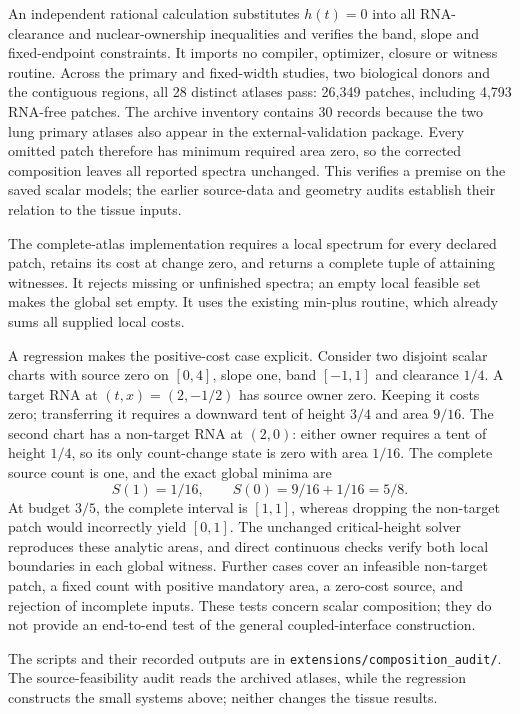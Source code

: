 \documentclass[10pt,letterpaper]{article}
\begin{document}
An independent rational calculation substitutes $h(t)=0$ into all RNA-clearance and nuclear-ownership inequalities and verifies the band, slope and fixed-endpoint constraints. It imports no compiler, optimizer, closure or witness routine. Across the primary and fixed-width studies, two biological donors and the contiguous regions, all 28 distinct atlases pass: 26,349 patches, including 4,793 RNA-free patches. The archive inventory contains 30 records because the two lung primary atlases also appear in the external-validation package. Every omitted patch therefore has minimum required area zero, so the corrected composition leaves all reported spectra unchanged. This verifies a premise on the saved scalar models; the earlier source-data and geometry audits establish their relation to the tissue inputs.

The complete-atlas implementation requires a local spectrum for every declared patch, retains its cost at change zero, and returns a complete tuple of attaining witnesses. It rejects missing or unfinished spectra; an empty local feasible set makes the global set empty. It uses the existing min-plus routine, which already sums all supplied local costs.

A regression makes the positive-cost case explicit. Consider two disjoint scalar charts with source zero on $[0,4]$, slope one, band $[-1,1]$ and clearance $1/4$. A target RNA at $(t,x)=(2,-1/2)$ has source owner zero. Keeping it costs zero; transferring it requires a downward tent of height $3/4$ and area $9/16$. The second chart has a non-target RNA at $(2,0)$: either owner requires a tent of height $1/4$, so its only count-change state is zero with area $1/16$. The complete source count is one, and the exact global minima are
\[
 S(1)=1/16,\qquad S(0)=9/16+1/16=5/8.
\]
At budget $3/5$, the complete interval is $[1,1]$, whereas dropping the non-target patch would incorrectly yield $[0,1]$. The unchanged critical-height solver reproduces these analytic areas, and direct continuous checks verify both local boundaries in each global witness. Further cases cover an infeasible non-target patch, a fixed count with positive mandatory area, a zero-cost source, and rejection of incomplete inputs. These tests concern scalar composition; they do not provide an end-to-end test of the general coupled-interface construction.

The scripts and their recorded outputs are in \texttt{extensions/composition\_audit/}. The source-feasibility audit reads the archived atlases, while the regression constructs the small systems above; neither changes the tissue results.
\end{document}
